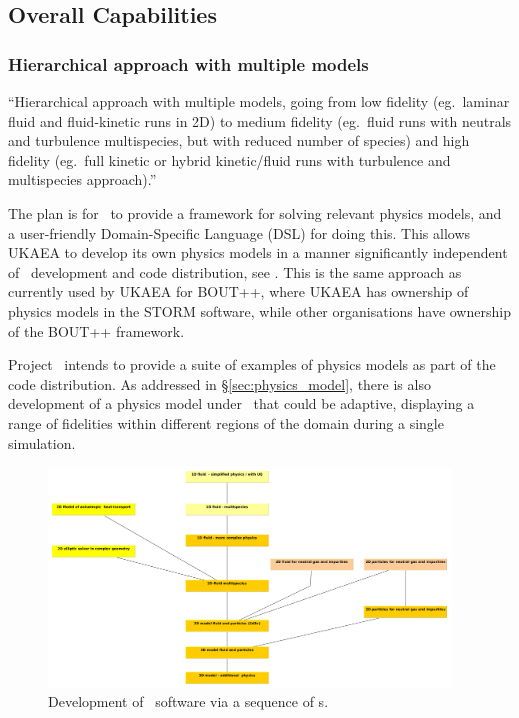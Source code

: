 \subsection{Overall Capabilities}
\label{sec:capabilities}

\subsubsection{Hierarchical approach with multiple models}

``Hierarchical approach with multiple models, going from low fidelity
(eg.\  laminar fluid and fluid-kinetic runs in 2D) to medium fidelity (eg.\ 
fluid runs with neutrals and turbulence  multispecies, but with reduced number
of species) and high fidelity (eg.\  full kinetic or hybrid kinetic/fluid runs
with turbulence and multispecies approach).''

The plan is for \nep\ to provide a framework for solving relevant physics
models, and a user-friendly Domain-Specific Language (DSL) for doing this.
This allows UKAEA to develop its own physics models in a manner significantly
independent of \nep\ development and code distribution, see \Fig{proxyflow2}.
This is the same approach as currently used by UKAEA for BOUT++,
where UKAEA has ownership of physics models in the STORM software, while other organisations have
ownership of the BOUT++ framework.

Project \nep \ intends to provide a suite of examples of physics models as part of the code
distribution.
As addressed in \S\ref{sec:physics_model}, there is also development of a
physics model under \nep\ that could be adaptive, displaying a range
of fidelities within different regions of the domain during a single
simulation.

\begin{figure}
\centerline{\includegraphics[width=0.95\textwidth]{./pics/proxyflow2.png}}
\caption{
Development of \nep \ software via a sequence of \papp s.
\label{fig:proxyflow2}}
\end{figure}

